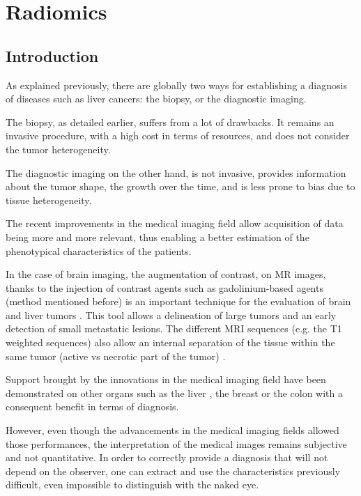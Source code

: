 \documentclass[]{article}
\begin{document}
\section*{Radiomics}\label{radiomics}

\subsection*{Introduction}\label{introduction}

As explained previously, there are globally two ways for establishing a
diagnosis of diseases such as liver cancers: the biopsy, or the
diagnostic imaging.

The biopsy, as detailed earlier, suffers from a lot of drawbacks. It
remains an invasive procedure, with a high cost in terms of resources,
and does not consider the tumor heterogeneity.

The diagnostic imaging on the other hand, is not invasive, provides
information about the tumor shape, the growth over the time, and is less
prone to bias due to tissue heterogeneity.

The recent improvements in the medical imaging field allow acquisition
of data being more and more relevant, thus enabling a better estimation
of the phenotypical characteristics of the patients.

In the case of brain imaging, the augmentation of contrast, on MR
images, thanks to the injection of contrast agents such as
gadolinium-based agents (method mentioned before) is an important
technique for the evaluation of brain and liver tumors \cite{Drevelegas2011,Zhou2014,Thian2013}. This tool allows a delineation of large tumors and an
early detection of small metastatic lesions. The different MRI sequences
(e.g. the T1 weighted sequences) also allow an internal separation of
the tissue within the same tumor (active vs necrotic part of the tumor)
\cite{Drevelegas2011}.

Support brought by the innovations in the medical imaging field have
been demonstrated on other organs such as the liver \cite{Davnall2012}, the breast \cite{Koolen2012} or the colon
\cite{Sahani2014} with a consequent benefit in terms of
diagnosis.

However, even though the advancements in the medical imaging fields
allowed those performances, the interpretation of the medical images
remains subjective and not quantitative. In order to correctly provide a
diagnosis that will not depend on the observer, one can extract and use
the characteristics previously difficult, even impossible to distinguish
with the naked eye.
\end{document}
